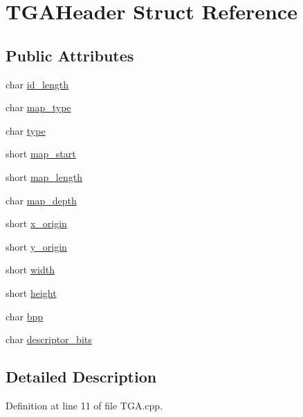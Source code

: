 \hypertarget{struct_t_g_a_header}{\section{T\+G\+A\+Header Struct Reference}
\label{struct_t_g_a_header}
}
\subsection*{Public Attributes}
\begin{DoxyCompactItemize}
\item 
char \hyperlink{struct_t_g_a_header_aa8452ce11ec3d3f59459dd2c2a799709}{id\+\_\+length}
\item 
char \hyperlink{struct_t_g_a_header_a1ab899cc4033d3c56c97f4c7666ceb47}{map\+\_\+type}
\item 
char \hyperlink{struct_t_g_a_header_ae100ea914ad090f7878a2cae04b39640}{type}
\item 
short \hyperlink{struct_t_g_a_header_a4f186870a13d0825101121f0688f0fc6}{map\+\_\+start}
\item 
short \hyperlink{struct_t_g_a_header_a9260b0a44a5a33b4abcbf6e0f8c3934c}{map\+\_\+length}
\item 
char \hyperlink{struct_t_g_a_header_a12350dee94e8b261256ebc0e34dc3167}{map\+\_\+depth}
\item 
short \hyperlink{struct_t_g_a_header_a3a210fd7133b1443977ecbed3974516e}{x\+\_\+origin}
\item 
short \hyperlink{struct_t_g_a_header_a5dad60cc55161642e2e5b469da05433b}{y\+\_\+origin}
\item 
short \hyperlink{struct_t_g_a_header_a4ecf23c7b373b578053daed7640919b9}{width}
\item 
short \hyperlink{struct_t_g_a_header_afd860454068cafca5048f9a9b0c3edc5}{height}
\item 
char \hyperlink{struct_t_g_a_header_a32a4bc2d8730d0cdf7659cd8c49bd83f}{bpp}
\item 
char \hyperlink{struct_t_g_a_header_ab85bf0dd4e2ae87f173c301348be6220}{descriptor\+\_\+bits}
\end{DoxyCompactItemize}


\subsection{Detailed Description}


Definition at line 11 of file T\+G\+A.\+cpp.



